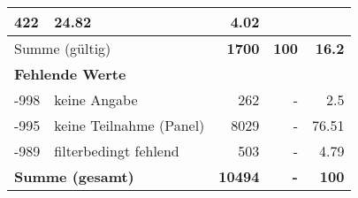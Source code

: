 \begin{longtable}{lXrrr}
       \num{422} &
       \num[round-mode=places,round-precision=2]{24,82} &
         \num[round-mode=places,round-precision=2]{4,02} \\
     \midrule
     \multicolumn{2}{l}{Summe (gültig)} &
       \textbf{\num{1700}} &
     \textbf{100} &
       \textbf{\num[round-mode=places,round-precision=2]{16,2}} \\
     \multicolumn{5}{l}{\textbf{Fehlende Werte}}\\
       -998 &
       keine Angabe &
         \num{262} &
        - &
         \num[round-mode=places,round-precision=2]{2,5} \\
       -995 &
       keine Teilnahme (Panel) &
         \num{8029} &
        - &
         \num[round-mode=places,round-precision=2]{76,51} \\
       -989 &
       filterbedingt fehlend &
         \num{503} &
        - &
         \num[round-mode=places,round-precision=2]{4,79} \\
     \midrule
     \multicolumn{2}{l}{\textbf{Summe (gesamt)}} &
          \textbf{\num{10494}} &
        \textbf{-} &
        \textbf{100} \\
     \bottomrule
     \end{longtable}
     

